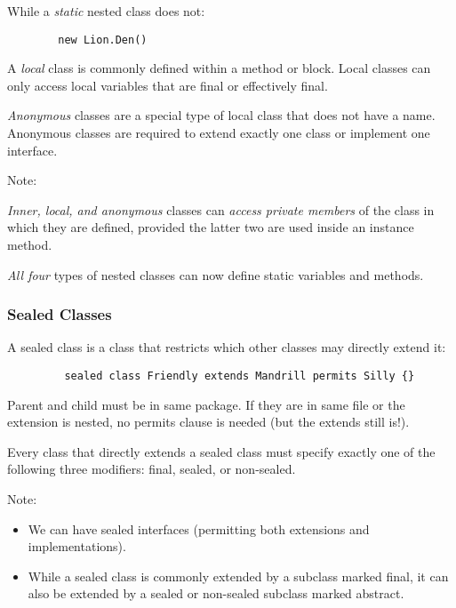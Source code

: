 \documentclass{scrartcl}
\begin{document}
    While a \textit{static} nested class does not:

    \begin{lstlisting}
        new Lion.Den()
    \end{lstlisting}

    A \textit{local} class is commonly defined within a method or block.
    Local classes can only access local variables that are final or effectively final.

    \textit{Anonymous} classes are a special type of local class that does not have a name.
    Anonymous classes are required to extend exactly one class or implement one interface.

    Note:

    \textit{Inner, local, and anonymous} classes can \textit{access private members} of the class in which they are defined, provided the latter two are used inside an instance method.

    \textit{All four} types of nested classes can now define static variables and methods.

\subsubsection{Sealed Classes}

    A sealed class is a class that restricts which other classes may directly extend it:

    \begin{lstlisting}
         sealed class Friendly extends Mandrill permits Silly {}
    \end{lstlisting}

    Parent and child must be in same package. If they are in same file or the extension is nested, no permits clause is needed (but the extends still is!).

    Every class that directly extends a sealed class must specify exactly one of the following three modifiers: final, sealed, or non-­sealed.

    Note:


    \begin{itemize}
        \item   We can have sealed interfaces (permitting both extensions and implementations).
        \item While a sealed class is commonly extended by a subclass marked final, it can also be extended by a sealed or non-­sealed subclass marked abstract.
    \end{itemize}
\end{document}
